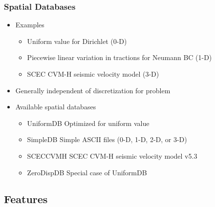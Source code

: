 \documentclass{beamer}
\newcommand{\dbtype}[1]{{\color{green}#1}}
\begin{document}
\begin{frame}
  \frametitle{Spatial Databases}

  \begin{itemize}
 \item Examples
    \begin{itemize}
    \item Uniform value for Dirichlet (0-D)
    \item Piecewise linear variation in tractions for Neumann BC (1-D)
    \item SCEC CVM-H seismic velocity model (3-D)
    \end{itemize}
  \item Generally independent of discretization for problem
  \item Available spatial databases
    \begin{itemize}
    \item \dbtype{UniformDB} Optimized for uniform value
    \item \dbtype{SimpleDB} Simple ASCII files (0-D, 1-D, 2-D, or 3-D)
    \item \dbtype{SCECCVMH} SCEC CVM-H seismic velocity model v5.3
    \item \dbtype{ZeroDispDB} Special case of UniformDB
    \end{itemize}
 \end{itemize}

\end{frame}


\subsection{Features}
\end{document}
